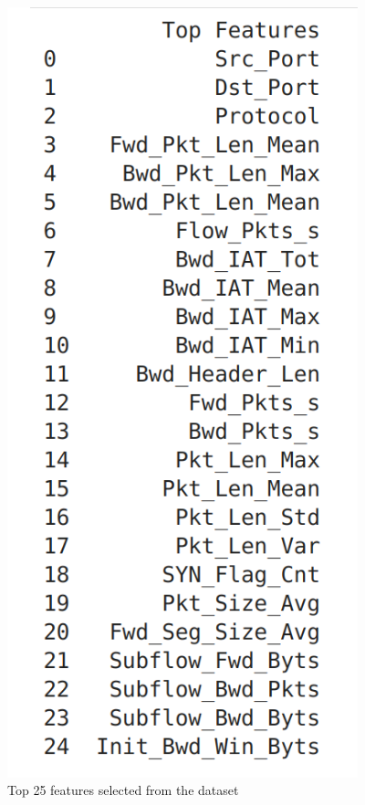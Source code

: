 \begin{figure}[tbh]
	\begin{center}
		\includegraphics[width=4in]{images/topF.png}
		\caption{Top 25 features selected from the dataset }
		\label{Top 25 features selected from the dataset}
	\end{center}
\end{figure}
\renewcommand\bibname{References} %

